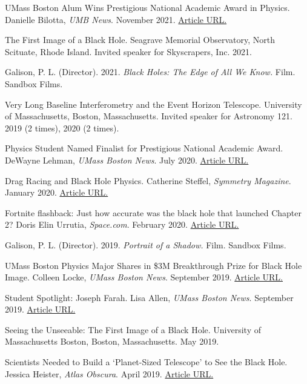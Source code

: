 \documentclass[margin,line]{res}
\begin{document}
\begin{resume}
UMass Boston Alum Wins Prestigious National Academic Award in Physics. Danielle Bilotta, \textit{UMB News}. November 2021. {\color{blue}\href{https://www.umb.edu/news/detail/umass_boston_alum_wins_prestigious_national_academic_award_in_physics}{Article URL.}}

The First Image of a Black Hole. Seagrave Memorial Observatory, North Scituate, Rhode Island. Invited speaker for Skyscrapers, Inc. 2021.

Galison, P. L. (Director). 2021. \textit{Black Holes: The Edge of All We Know.} Film. Sandbox Films.

Very Long Baseline Interferometry and the Event Horizon Telescope. University of Massachusetts, Boston, Massachusetts. Invited speaker for Astronomy 121. 2019 (2 times), 2020 (2 times).

Physics Student Named Finalist for Prestigious National Academic Award. DeWayne Lehman, \textit{UMass Boston News}. July 2020. {\color{blue}\href{https://www.umb.edu/news/detail/physics_student_named_finalist_for_prestigious_national_academic_award}{Article URL.}}

Drag Racing and Black Hole Physics. Catherine Steffel, \textit{Symmetry Magazine}. January 2020. {\color{blue}\href{https://www.symmetrymagazine.org/article/drag-racing-and-black-hole-physics}{Article URL.}}

Fortnite flashback: Just how accurate was the black hole that launched Chapter 2? Doris Elin Urrutia, \textit{Space.com}. February 2020. {\color{blue}\href{https://www.atlasobscura.com/articles/biggest-telescope-black-hole}{Article URL.}}

Galison, P. L. (Director). 2019. \textit{Portrait of a Shadow.} Film. Sandbox Films.


UMass Boston Physics Major Shares in \$3M Breakthrough Prize for Black Hole Image. Colleen Locke, \textit{UMass Boston News}. September 2019. {\color{blue}\href{https://www.umb.edu/news/detail/umass_boston_physics_major_shares_in_3m_breakthrough_prize_for_black_hole_image}{Article URL.}}

Student Spotlight: Joseph Farah. Lisa Allen, \textit{UMass Boston News}. September 2019. {\color{blue}\href{https://www.umb.edu/news/detail/student_spotlight_joseph_farah}{Article URL.}}

Seeing the Unseeable: The First Image of a Black Hole. University of Massachusetts Boston, Boston, Massachusetts. May 2019.

Scientists Needed to Build a ‘Planet-Sized Telescope’ to See the Black Hole. Jessica Heister, \textit{Atlas Obscura}. April 2019. {\color{blue}\href{https://www.space.com/fortnite-chapter-2-black-hole-science.html}{Article URL.}}


\end{resume}
\end{document}

